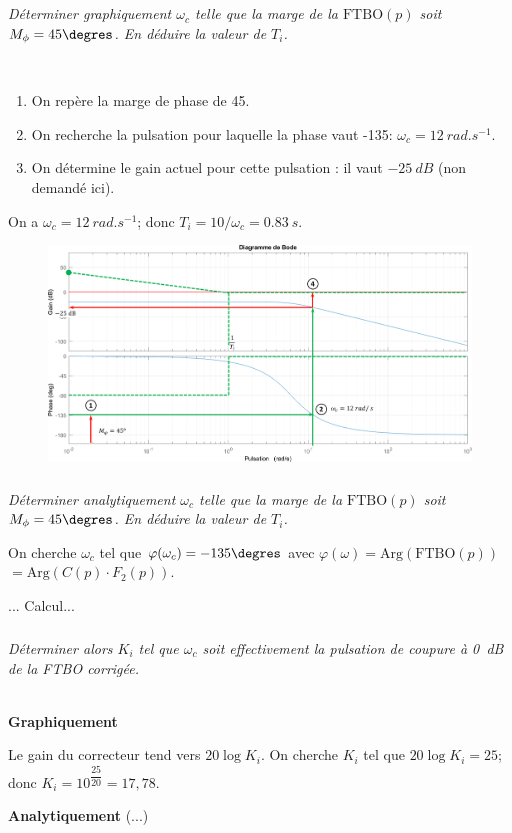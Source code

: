 \documentclass[10pt,fleqn]{article} %
\begin{document}
\subparagraph{\label{q_32}}\textit{Déterminer graphiquement $\omega_c$ telle que la marge de la $\text{FTBO}(p)$ soit $M_{\phi}=45\degres$. En déduire la valeur de $T_i$.}
\ifprof
\begin{corrige}~\\
\begin{enumerate}
\item On repère la marge de phase de 45\degres.
\item On recherche la pulsation pour laquelle la phase vaut -135\degres : $\omega_c = \SI{12}{rad.s^{-1}}$.
\item On détermine le gain actuel pour cette pulsation : il vaut $-\SI{25}{dB}$ (non demandé ici). 
\end{enumerate}

On a  $\omega_c = \SI{12}{rad.s^{-1}}$; donc $T_i = 10/\omega_c = \SI{0,83}{s}$.

\begin{figure}[H]
\centering
\includegraphics[width=0.7\linewidth]{cor_13}
\end{figure}



\end{corrige}
\else
\fi

\subparagraph{\label{q_32_bis}}\textit{Déterminer analytiquement $\omega_c$ telle que la marge de la $\text{FTBO}(p)$ soit $M_{\phi}=45\degres$. En déduire la valeur de $T_i$.}
\ifprof
\begin{corrige}
On cherche $\omega_c$ tel que $\varphi(\omega_c)=-135\degres$ avec $\varphi(\omega)=\text{Arg}\left(\text{FTBO}(p)\right)$ $ =\text{Arg}\left(C(p)\cdot {F_2}(p)\right)$. 

... Calcul...


\end{corrige}
\else
\fi

\subparagraph{\label{q_33}}\textit{Déterminer alors $K_i$ tel que $\omega_c$ soit effectivement la pulsation de coupure à \SI{0}{dB} de la FTBO corrigée.}
\ifprof
\begin{corrige} ~\\

\textbf{Graphiquement}

Le gain du correcteur tend vers $20 \log K_i $. On cherche $K_i$ tel que $20 \log K_i = 25$; donc $K_i = 10^{\dfrac{25}{20}}  = 17,78$.


\textbf{Analytiquement}
(...)
\end{corrige}
\else
\fi
\end{document}
